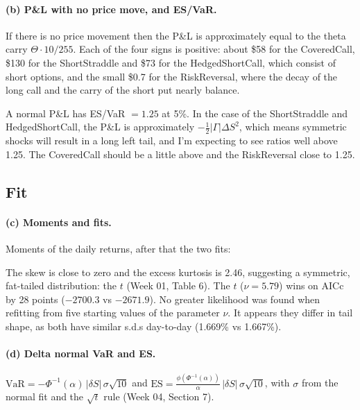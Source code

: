 \documentclass[11pt]{article}
\newcommand{\tbl}[1]{}
\begin{document}
\paragraph{(b) P\&L with no price move, and ES/VaR.} If there is no price movement then the P\&L is approximately equal to the theta carry $\Theta\cdot10/255$. Each of the four signs is positive: about \$58 for the CoveredCall, \$130 for the ShortStraddle and \$73 for the HedgedShortCall, which consist of short options, and the small \$0.7 for the RiskReversal, where the decay of the long call and the carry of the short put nearly balance.

A normal P\&L has ES/VaR $=1.25$ at 5\%. In the case of the ShortStraddle and HedgedShortCall, the P\&L is approximately $-\tfrac12|\Gamma|\Delta S^2$, which means symmetric shocks will result in a long left tail, and I'm expecting to see ratios well above 1.25. The CoveredCall should be a little above and the RiskReversal close to 1.25.

\subsection*{Fit}

\paragraph{(c) Moments and fits.} Moments of the daily returns, after that the two fits:

\begin{table}[H]
\centering\small
\caption{ABC daily arithmetic returns.}
\tbl{p3_moments}
\end{table}

\begin{table}[H]
\centering\small
\caption{Normal and Student $t$ fits. ``Implied s.d.'' is $\sigma\sqrt{\nu/(\nu-2)}$ for the $t$.}
\label{tab:p3fits}
\tbl{p3_fits}
\end{table}

The skew is close to zero and the excess kurtosis is 2.46, suggesting a symmetric, fat-tailed distribution: the $t$ (Week 01, Table 6). The $t$ ($\nu=5.79$) wins on AICc by 28 points ($-2700.3$ vs $-2671.9$). No greater likelihood was found when refitting from five starting values of the parameter $\nu$. It appears they differ in tail shape, as both have similar s.d.s day-to-day (1.669\% vs 1.667\%).

\paragraph{(d) Delta normal VaR and ES.} $\mathrm{VaR}=-\Phi^{-1}(\alpha)\,|\delta S|\,\sigma\sqrt{10}$ and $\mathrm{ES}=\frac{\phi(\Phi^{-1}(\alpha))}{\alpha}\,|\delta S|\,\sigma\sqrt{10}$, with $\sigma$ from the normal fit and the $\sqrt{t}$ rule (Week 04, Section 7).
\end{document}
